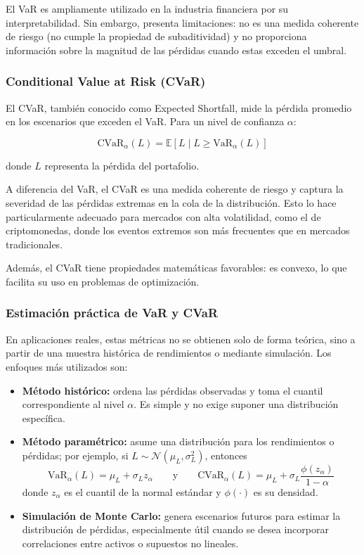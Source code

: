 \documentclass[12pt]{article}
\begin{document}
El VaR es ampliamente utilizado en la industria financiera por su
interpretabilidad. Sin embargo, presenta limitaciones: no es una
medida coherente de riesgo (no cumple la propiedad de subaditividad)
y no proporciona información sobre la magnitud de las pérdidas cuando
estas exceden el umbral.

\subsubsection{Conditional Value at Risk (CVaR)}

El CVaR, también conocido como Expected Shortfall, mide la pérdida
promedio en los escenarios que exceden el VaR. Para un nivel de
confianza $\alpha$:

\begin{equation}
  \mathrm{CVaR}_{\alpha}(L) = \mathbb{E}\left[L \mid L
  \ge \mathrm{VaR}_{\alpha}(L)\right]
\end{equation}

donde $L$ representa la pérdida del portafolio.

A diferencia del VaR, el CVaR es una medida coherente de riesgo y
captura la severidad de las pérdidas extremas en la cola de la
distribución. Esto lo hace particularmente adecuado para mercados con
alta volatilidad, como el de criptomonedas, donde los eventos
extremos son más frecuentes que en mercados tradicionales.

Además, el CVaR tiene propiedades matemáticas favorables: es convexo,
lo que facilita su uso en problemas de optimización.

\subsubsection{Estimación práctica de VaR y CVaR}

En aplicaciones reales, estas métricas no se obtienen solo de forma
teórica, sino a partir de una muestra histórica de rendimientos o
mediante simulación. Los enfoques más utilizados son:

\begin{itemize}
  \item \textbf{Método histórico:} ordena las pérdidas observadas y
    toma el cuantil correspondiente al nivel $\alpha$. Es simple y no
    exige suponer una distribución específica.
  \item \textbf{Método paramétrico:} asume una distribución para los
    rendimientos o pérdidas; por ejemplo, si $L \sim \mathcal{N}
    (\mu_L, \sigma_L^2)$, entonces
    \begin{equation}
      \mathrm{VaR}_{\alpha}(L) = \mu_L + \sigma_L z_{\alpha}
      \qquad \text{y} \qquad
      \mathrm{CVaR}_{\alpha}(L) = \mu_L + \sigma_L
      \frac{\phi(z_{\alpha})}{1-\alpha}
    \end{equation}
    donde $z_{\alpha}$ es el cuantil de la normal estándar y
    $\phi(\cdot)$ es su densidad.
  \item \textbf{Simulación de Monte Carlo:} genera escenarios futuros
    para estimar la distribución de pérdidas, especialmente útil cuando
    se desea incorporar correlaciones entre activos o supuestos no
    lineales.
\end{itemize}
\end{document}
